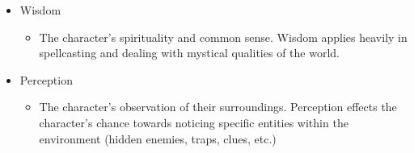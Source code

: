 \documentclass[12pt,a4paper]{report}
\begin{document}
\begin{itemize}
\begin{itemize}
			\end{itemize}
			\item Wisdom
			\begin{itemize}
				\item The character's spirituality and common sense. Wisdom applies heavily in spellcasting and dealing with mystical qualities of the world. 
			\end{itemize}
			\item Perception
			\begin{itemize}
				\item The character's observation of their surroundings. Perception effects the character's chance towards noticing specific entities within the environment (hidden enemies, traps, clues, etc.)
			\end{itemize}
		\end{itemize}
		\newpage
\end{document}
